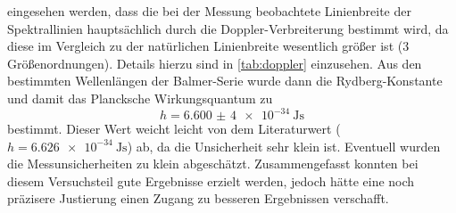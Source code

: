 eingesehen werden, dass die bei der Messung beobachtete Linienbreite der Spektrallinien hauptsächlich durch die Doppler-Verbreiterung
bestimmt wird, da diese im Vergleich zu der natürlichen Linienbreite wesentlich größer ist (3 Größenordnungen). Details hierzu sind in
\cref{tab:doppler} einzusehen. Aus den bestimmten Wellenlängen der Balmer-Serie wurde dann die Rydberg-Konstante und damit
das Plancksche Wirkungsquantum zu
\begin{equation*}
    h = \SI{6,600(4)e-34}{\joule \second}
\end{equation*} bestimmt. Dieser Wert weicht leicht von dem Literaturwert ($h = \SI{6,626e-34}{\joule \second}$) ab, da die
Unsicherheit sehr klein ist. Eventuell wurden die Messunsicherheiten zu klein abgeschätzt.
Zusammengefasst konnten bei diesem Versuchsteil gute Ergebnisse erzielt werden, jedoch hätte eine noch präzisere Justierung einen Zugang
zu besseren Ergebnissen verschafft.
